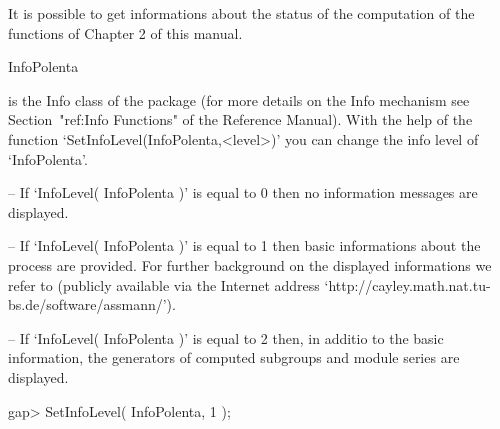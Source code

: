 
It is possible to get informations about the status of the computation of the 
functions of Chapter 2 of this manual.


\> InfoPolenta
 
is the Info class of the {\Polenta} package (for more details on the Info mechanism see Section~"ref:Info Functions" of the 
{\GAP} Reference Manual). 
With the help of the function 
`SetInfoLevel(InfoPolenta,<level>)' you can change 
the info level of `InfoPolenta'. 
\beginlist
\item{--}
  If  `InfoLevel( InfoPolenta )' is equal to 0 
 then no information 
  messages are displayed. 
\item{--}
  If `InfoLevel( InfoPolenta )' is equal to 1 then basic informations
  about the process are provided. For further background on the displayed 
  informations we refer to  \cite{Assmann} (publicly available via the 
  Internet address `http://cayley.math.nat.tu-bs.de/software/assmann/').
\item{--}
  If `InfoLevel( InfoPolenta )' is equal to 2 then, in additio to the 
  basic information, the generators of computed subgroups and module series
  are displayed. 
\endlist



\beginexample
gap> SetInfoLevel( InfoPolenta, 1 );

